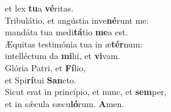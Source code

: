 \evenverse et lex \textbf{tu}a \textbf{vé}ritas.\\
\oddverse Tribulátio, et angústia inve\textbf{né}runt me:~\*\\
\oddverse mandáta tua medi\textbf{tá}tio \textbf{me}a est.\\
\evenverse Æquitas testimónia tua in æ\textbf{tér}num:~\*\\
\evenverse intelléctum da \textbf{mi}hi, et \textbf{vi}vam.\\
\oddverse Glória Patri, et \textbf{Fí}lio,~\*\\
\oddverse et Spi\textbf{rí}tui \textbf{San}cto.\\
\evenverse Sicut erat in princípio, et nunc, et \textbf{sem}per,~\*\\
\evenverse et in sǽcula sæcu\textbf{ló}rum. \textbf{A}men.\\

